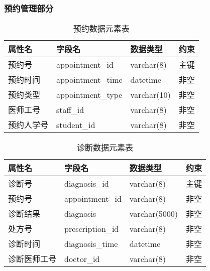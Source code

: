 \documentclass{article}
\begin{document}
\subsubsection{预约管理部分}

\begin{table}[H]
    \centering
    \begin{tabularx}{\textwidth}{|>{\raggedright\arraybackslash}X|>{\raggedright\arraybackslash}X|>{\raggedright\arraybackslash}X|>{\raggedright\arraybackslash}X|}
    \toprule
    \textbf{属性名} & \textbf{字段名} & \textbf{数据类型} & \textbf{约束} \\ \midrule
    预约号 & appointment\_id & varchar(8) & 主键 \\ \midrule
    预约时间 & appointment\_time & datetime & 非空 \\ \midrule
    预约类型 & appointment\_type & varchar(10) & 非空 \\ \midrule
    医师工号 & staff\_id & varchar(8) & 非空 \\ \midrule
    预约人学号 & student\_id & varchar(8) & 非空 \\ \bottomrule
    \end{tabularx}
    \caption{预约数据元素表}
    \label{tab:appointment_elements}
\end{table}

\begin{table}[H]
    \centering
    \begin{tabularx}{\textwidth}{|>{\raggedright\arraybackslash}X|>{\raggedright\arraybackslash}X|>{\raggedright\arraybackslash}X|>{\raggedright\arraybackslash}X|}
    \toprule
    \textbf{属性名} & \textbf{字段名} & \textbf{数据类型} & \textbf{约束} \\ \midrule
    诊断号 & diagnosis\_id & varchar(8) & 主键 \\ \midrule
    预约号 & appointment\_id & varchar(8) & 非空 \\ \midrule
    诊断结果 & diagnosis & varchar(5000) & 非空 \\ \midrule
    处方号 & prescription\_id & varchar(8) & 非空 \\ \midrule
    诊断时间 & diagnosis\_time & datetime & 非空 \\ \midrule
    诊断医师工号 & doctor\_id & varchar(8) & 非空 \\ \bottomrule
    \end{tabularx}
    \caption{诊断数据元素表}
    \label{tab:diagnosis_elements}
\end{table}
\end{document}
